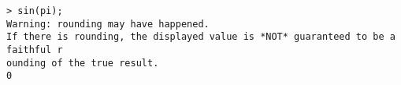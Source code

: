 \begin{center}\begin{minipage}{15cm}\begin{Verbatim}[frame=single]
> sin(pi);
Warning: rounding may have happened.
If there is rounding, the displayed value is *NOT* guaranteed to be a faithful r
ounding of the true result.
0
\end{Verbatim}
\end{minipage}\end{center}
